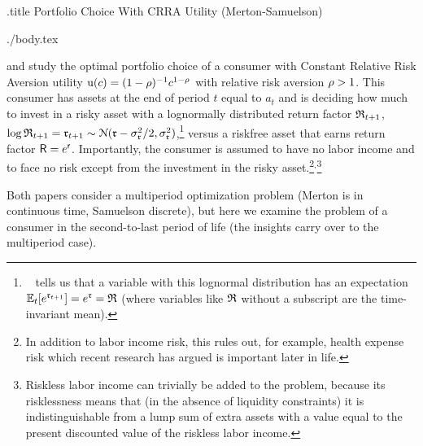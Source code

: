 \documentclass{bejournal}
\begin{document}


\begin{verbatimwrite}{\jobname.title}
Portfolio Choice With CRRA Utility (Merton-Samuelson)
\end{verbatimwrite}
\medskip\medskip\medskip



\begin{verbatimwrite}{./body.tex}

  \cite{merton:restat} and \cite{samuelson:portfolio} study the
  optimal portfolio choice of a consumer with Constant Relative Risk
  Aversion utility ${\mathrm{u}}(c) = (1-\rho)^{-1}c^{1-\rho}$ with
  relative risk aversion $\rho>1$.  This consumer has assets at the
  end of period $t$ equal to $a_{t}$ and is deciding how much to
  invest in a risky asset with a lognormally distributed return factor
  $\mathfrak{R}_{t+1}$, $\log \mathfrak{R}_{t+1} = \mathfrak{r}_{t+1} \sim
  \mathcal{N}(\mathfrak{r}-\sigma_{\mathfrak{r}}^{2}/2,\sigma^{2}_{\mathfrak{r}})$,\footnote{\MathFacts~
    tells us that a variable with this lognormal distribution has an
    expectation $\mathbb{E}_{t}[e^{\mathfrak{r}_{t+1}}]=e^{\mathfrak{r}}=\mathfrak{R}$ (where
    variables like $\mathfrak{R}$ without a subscript are the time-invariant
    mean).} versus a riskfree asset that earns return factor
  $\mathsf{R}=e^{\mathsf{r}}$.  Importantly, the consumer is assumed to have
  no labor income and to face no risk except from the investment in
  the risky asset.\footnote{In addition to labor income risk, this
    rules out, for example, health expense risk which recent research
    has argued is important later in life.}$^{,}$\footnote{Riskless
    labor income can trivially be added to the problem, because its
    risklessness means that (in the absence of liquidity constraints)
    it is indistinguishable from a lump sum of extra assets with a
    value equal to the present discounted value of the riskless labor
    income.}

Both papers consider a multiperiod optimization problem (Merton is in
continuous time, Samuelson discrete), but here we examine the problem
of a consumer in the second-to-last period of life (the insights carry
over to the multiperiod case).  


\end{verbatimwrite}
\end{document}
